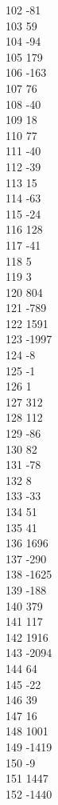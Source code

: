 { 102	-81 \\
 103	59 \\
 104	-94 \\
 105	179 \\
 106	-163 \\
 107	76 \\
 108	-40 \\
 109	18 \\
 110	77 \\
 111	-40 \\
 112	-39 \\
 113	15 \\
 114	-63 \\
 115	-24 \\
 116	128 \\
 117	-41 \\
 118	5 \\
 119	3 \\
 120	804 \\
 121	-789 \\
 122	1591 \\
 123	-1997 \\
 124	-8 \\
 125	-1 \\
 126	1 \\
 127	312 \\
 128	112 \\
 129	-86 \\
 130	82 \\
 131	-78 \\
 132	8 \\
 133	-33 \\
 134	51 \\
 135	41 \\
 136	1696 \\
 137	-290 \\
 138	-1625 \\
 139	-188 \\
 140	379 \\
 141	117 \\
 142	1916 \\
 143	-2094 \\
 144	64 \\
 145	-22 \\
 146	39 \\
 147	16 \\
 148	1001 \\
 149	-1419 \\
 150	-9 \\
 151	1447 \\
 152	-1440 \\
}

